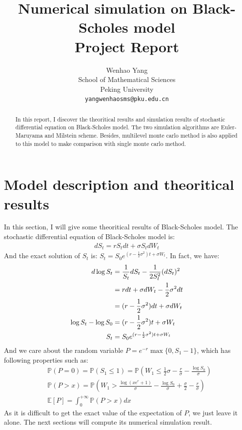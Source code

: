 \documentclass{article} %
\title{Numerical simulation on Black-Scholes model \\ Project Report}
\author{Wenhao Yang\\
School of Mathematical Sciences\\
Peking University\\
\texttt{yangwenhaosms@pku.edu.cn} \\
}
\begin{document}
\graphicspath{{../result/}}
\maketitle

\begin{abstract}
In this report, I discover the theoritical results and simulation results of stochastic differential equation on Black-Scholes model. The two simulation algorithms are Euler-Maruyama and Milstein scheme. Besides, multilevel monte carlo method is also applied to this model to make comparison with single monte carlo method.
\end{abstract}

\section{Model description and theoritical results}
In this section, I will give some theoritical results of Black-Scholes model. The stochastic differential equation of Black-Scholes model is:
\begin{align}
  dS_{t}=rS_{t}dt+\sigma S_{t}dW_{t}
\end{align}
And the exact solution of $S_{t}$ is: $S_{t}=S_{0}e^{(r-\frac{1}{2}\sigma^{2})t+\sigma W_{t}}$. In fact, we have:
\begin{align}
  d\log S_{t}&=\frac{1}{S_{t}}dS_{t}-\frac{1}{2S^{2}_{t}}(dS_{t})^{2}\notag\\
  &=rdt+\sigma dW_{t}-\frac{1}{2}\sigma^{2}dt\notag\\
  &=(r-\frac{1}{2}\sigma^{2})dt+\sigma dW_{t}\\
  \log S_{t}-\log S_{0}&=(r-\frac{1}{2}\sigma^{2})t+\sigma W_{t}\\
  S_{t}&=S_{0}e^{(r-\frac{1}{2}\sigma^{2})t+\sigma W_{t}}
\end{align}
And we care about the random variable $P=e^{-r}\max\{0,S_{1}-1\}$, which has following properties such as:
\begin{align}
  &\mathbb{P}(P=0)=\mathbb{P}(S_{1}\le 1)=\mathbb{P}(W_{1}\le\frac{1}{2}\sigma-\frac{r}{\sigma}-\frac{\log S_{0}}{\sigma})\\
  &\mathbb{P}(P>x)=\mathbb{P}(W_{1}>\frac{\log(xe^{r}+1)}{\sigma}-\frac{\log S_{0}}{\sigma}+\frac{\sigma}{2}-\frac{r}{\sigma})\\
  &\mathbb{E}[P]=\int_{0}^{+\infty}\mathbb{P}(P>x)dx
\end{align}
As it is difficult to get the exact value of the expectation of $P$, we just leave it alone. The next sections will compute its numerical simulation result.
\end{document}
